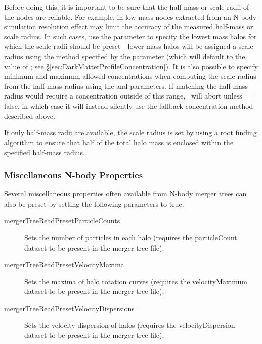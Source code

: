 Before doing this, it is important to be sure that the half-mass or scale radii of the nodes are reliable. For example, in low mass nodes extracted from an N-body simulation resolution effect may limit the accuracy of the measured half-mass or scale radius. In such cases, use the {\normalfont \ttfamily [mergerTreeReadPresetScaleRadiiMinimumMass]} parameter to specify the lowest mass halos for which the scale radii should be preset---lower mass halos will be assigned a scale radius using the method specified by the {\normalfont \ttfamily [mergerTreeReadConcentrationFallbackMethod]} parameter (which will default to the value of {\normalfont \ttfamily [darkMatterConcentrationMethod]}; see \S\ref{sec:DarkMatterProfileConcentration}). It is also possible to specify minimum and maximum allowed concentrations when computing the scale radius from the half mass radius using the {\normalfont \ttfamily [mergerTreeReadPresetScaleRadiiConcentrationMinimum]} and {\normalfont \ttfamily [mergerTreeReadPresetScaleRadiiConcentrationMaximum]} parameters. If matching the half mass radius would require a concentration outside of this range, \glc\ will abort unless {\normalfont \ttfamily [mergerTreeReadPresetScaleRadiiFailureIsFatal]}$=${\normalfont \ttfamily false}, in which case it will instead silently use the fallback concentration method described above.

If only half-mass radii are available, the scale radius is set by using a root finding algorithm to ensure that half of the total halo mass is enclosed within the specified half-mass radius.

\subsubsection{Miscellaneous N-body Properties}

Several miscellaneous properties often available from N-body merger trees can also be preset by setting the following parameters to {\normalfont \ttfamily true}:
\begin{description}
\item[{mergerTreeReadPresetParticleCounts}] Sets the number of particles in each halo (requires the {\normalfont \ttfamily particleCount} dataset to be present in the merger tree file);
\item[{mergerTreeReadPresetVelocityMaxima}] Sets the maxima of halo rotation curves (requires the {\normalfont \ttfamily velocityMaximum} dataset to be present in the merger tree file);
\item[{mergerTreeReadPresetVelocityDispersions}] Sets the velocity dispersion of halos (requires the {\normalfont \ttfamily velocityDispersion} dataset to be present in the merger tree file).
\end{description}

